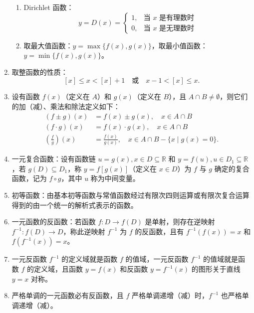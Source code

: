 \documentclass[UTF8]{ctexart}
\theoremstyle{remark}
\begin{document}
\begin{enumerate}
\begin{enumerate}
			\item Dirichlet 函数：$$ y = D(x) = 
			\begin{cases}
				1, & \text{当 } x \text{ 是有理数时} \\
				0, & \text{当 } x \text{ 是无理数时}
			\end{cases} $$
			
			\item 取最大值函数：$ y = \max\{f(x), g(x)\} $，取最小值函数：$ y = \min\{f(x), g(x)\} $。
		\end{enumerate}
		
		\item 取整函数的性质：$$ [x] \leq x < [x] + 1 \quad \text{或} \quad x - 1 < [x] \leq x. $$
		
		\item 设有函数 $ f(x) $（定义在 $ A $）和 $ g(x) $（定义在 $ B $），且 $ A \cap B \neq \emptyset $，则它们的加（减）、乘法和除法定义如下：
		\begin{align*}
			(f \pm g)(x) &= f(x) \pm g(x), \quad x \in A \cap B \\
			(f \cdot g)(x) &= f(x) \cdot g(x), \quad x \in A \cap B \\
			\left( \frac{f}{g} \right)(x) &= \frac{f(x)}{g(x)}, \quad x \in A \cap B - \{x \mid g(x) = 0\}.
		\end{align*}
		
		\item 一元复合函数：设有函数链 $ u = g(x), x \in D \subseteq \mathbb{R} $ 和 $ y = f(u), u \in D_1 \subseteq \mathbb{R} $，若 $ g(D) \subseteq D_1 $，称 $ y = f[g(x)] $（定义在 $ x \in D $）为 $ f $ 与 $ g $ 确定的复合函数，记为 $ f \circ g $，其中 $ u $ 称为中间变量。
		
		\item 初等函数：由基本初等函数与常值函数经过有限次四则运算或有限次复合运算得到的由一个统一的解析式表示的函数。
		
		\item 一元函数的反函数：若函数 $ f: D \to f(D) $ 是单射，则存在逆映射 $ f^{-1}: f(D) \to D $，称此逆映射 $ f^{-1} $ 为 $ f $ 的反函数，且有 $ f^{-1}(f(x)) = x $ 和 $ f(f^{-1}(x)) = x $。
		
		\item 一元反函数 $ f^{-1} $ 的定义域就是函数 $ f $ 的值域，一元反函数 $ f^{-1} $ 的值域就是函数 $ f $ 的定义域，且函数 $ y = f(x) $ 和反函数 $ y = f^{-1}(x) $ 的图形关于直线 $ y = x $ 对称。
		
		\item 严格单调的一元函数必有反函数，且 $ f $ 严格单调递增（减）时，$ f^{-1} $ 也严格单调递增（减）。
		

\end{enumerate}
\end{document}

